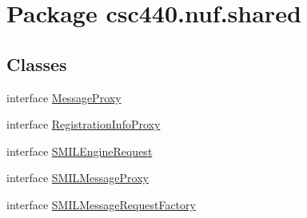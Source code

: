 \hypertarget{namespacecsc440_1_1nuf_1_1shared}{\section{Package csc440.\-nuf.\-shared}
\label{namespacecsc440_1_1nuf_1_1shared}
}
\subsection*{Classes}
\begin{DoxyCompactItemize}
\item 
interface \hyperlink{interfacecsc440_1_1nuf_1_1shared_1_1_message_proxy}{Message\-Proxy}
\item 
interface \hyperlink{interfacecsc440_1_1nuf_1_1shared_1_1_registration_info_proxy}{Registration\-Info\-Proxy}
\item 
interface \hyperlink{interfacecsc440_1_1nuf_1_1shared_1_1_s_m_i_l_engine_request}{S\-M\-I\-L\-Engine\-Request}
\item 
interface \hyperlink{interfacecsc440_1_1nuf_1_1shared_1_1_s_m_i_l_message_proxy}{S\-M\-I\-L\-Message\-Proxy}
\item 
interface \hyperlink{interfacecsc440_1_1nuf_1_1shared_1_1_s_m_i_l_message_request_factory}{S\-M\-I\-L\-Message\-Request\-Factory}
\end{DoxyCompactItemize}
